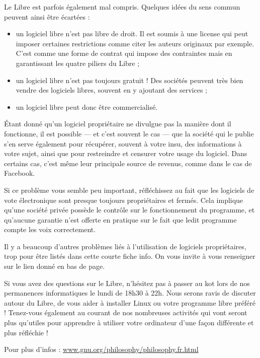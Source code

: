 \documentclass[12pt]{../fiche}
\begin{document}
Le Libre est parfois également mal compris. Quelques idées du sens commun peuvent ainsi être écartées :
\begin{itemize}
\item un logiciel libre n'est pas libre de droit. Il est soumis à une license qui peut imposer certaines restrictions comme citer les auteurs originaux par exemple. C'est comme une forme de contrat qui impose des contraintes mais en garantissant les quatre piliers du Libre ;
\item un logiciel libre n'est pas toujours gratuit ! Des sociétés peuvent très bien vendre des logiciels libres, souvent en y ajoutant des services ;
\item un logiciel libre peut donc être commercialisé.
\end{itemize}

\vspace{0.8em}

Étant donné qu'un logiciel propriétaire ne divulgue pas la manière dont il fonctionne, il est possible --- et c'est souvent le cas --- que la société qui le publie s'en serve également pour récupérer, souvent à votre insu, des informations à votre sujet, ainsi que pour restreindre et censurer votre usage du logiciel. Dans certains cas, c'est même leur principale source de revenus, comme dans le cas de Facebook.

Si ce problème vous semble peu important, réfléchissez au fait que les logiciels de vote électronique sont presque toujours propriétaires et fermés. Cela implique qu'une société privée possède le contrôle sur le fonctionnement du programme, et qu'aucune garantie n'est offerte en pratique sur le fait que ledit programme compte les voix correctement.

Il y a beaucoup d'autres problèmes liés à l'utilisation de logiciels propriétaires, trop pour être listés dans cette courte fiche info. On vous invite à vous renseigner sur le lien donné en bas de page.

\vspace{0.8em}

Si vous avez des questions sur le Libre, n'hésitez pas à passer au kot lors de nos permanences informatiques le lundi de 18h30 à 22h. Nous serons ravis de discuter autour du Libre, de vous aider à installer Linux ou votre programme libre préféré ! Tenez-vous également au courant de nos nombreuses activités qui vont seront plus qu'utiles pour apprendre à utiliser votre ordinateur d'une façon différente et plus réfléchie !
\vspace{0.8em}

Pour plus d'infos : \url{www.gnu.org/philosophy/philosophy.fr.html}
\end{document}
